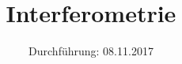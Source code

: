 

\subject{V64}
\title{Interferometrie}
\date{
  Durchführung: 08.11.2017
  \hspace{3em}
}



\maketitle
\thispagestyle{empty}
\tableofcontents
\newpage







\nocite{*}
\printbibliography

%


